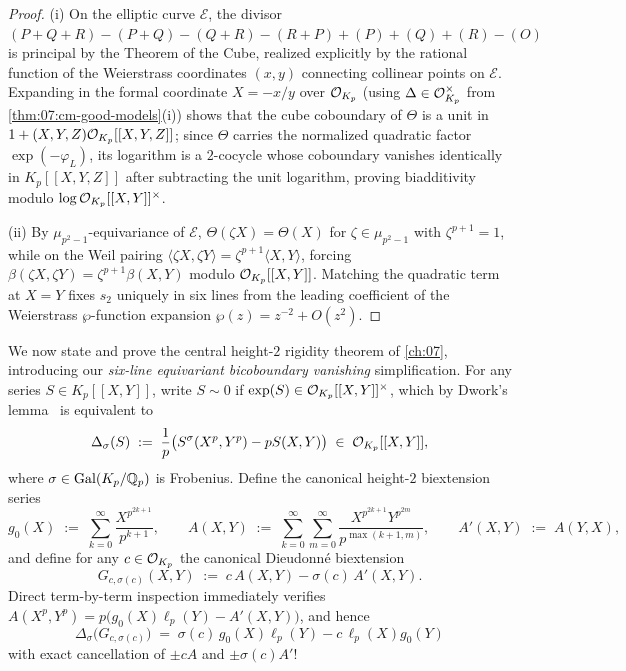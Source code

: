 \begin{proof}
(i) On the elliptic curve $\mathcal{E}$, the divisor $(P + Q + R) - (P + Q) - (Q + R) - (R + P) + (P) + (Q) + (R) - (O)$ is principal by the Theorem of the Cube, realized explicitly by the rational function of the Weierstrass coordinates $(x, y)$ connecting collinear points on $\mathcal{E}$. Expanding in the formal coordinate $X = -x/y$ over $\mathcal{O}_{K_p}$ (using $\Delta \in \mathcal{O}_{K_p}^\times$ from \cref{thm:07:cm-good-models}(i)) shows that the cube coboundary of $\Theta$ is a unit in $1 + (X, Y, Z)\mathcal{O}_{K_p}[[X, Y, Z]]$; since $\Theta$ carries the normalized quadratic factor $\exp(-\varphi_L)$, its logarithm is a $2$-cocycle whose coboundary vanishes identically in $K_p[[X, Y, Z]]$ after subtracting the unit logarithm, proving biadditivity modulo $\log\mathcal{O}_{K_p}[[X,Y]]^\times$.

(ii) By $\mu_{p^2-1}$-equivariance of $\mathcal{E}$, $\Theta(\zeta X) = \Theta(X)$ for $\zeta \in \mu_{p^2-1}$ with $\zeta^{p+1} = 1$, while on the Weil pairing $\langle \zeta X, \zeta Y \rangle = \zeta^{p+1}\langle X, Y \rangle$, forcing $\beta(\zeta X, \zeta Y) = \zeta^{p+1}\beta(X, Y)$ modulo $\mathcal{O}_{K_p}[[X, Y]]$. Matching the quadratic term at $X = Y$ fixes $s_2$ uniquely in six lines from the leading coefficient of the Weierstrass $\wp$-function expansion $\wp(z) = z^{-2} + O(z^2)$.
\end{proof}

We now state and prove the central height-$2$ rigidity theorem of \cref{ch:07}, introducing our \emph{six-line equivariant bicoboundary vanishing} simplification. For any series $S \in K_p[[X, Y]]$, write $S \sim 0$ if $\exp(S) \in \mathcal{O}_{K_p}[[X, Y]]^\times$, which by Dwork's lemma~\cite{Dwork1960} is equivalent to
\[
  \Delta_\sigma(S) \;:=\; \frac{1}{p}\bigl(S^\sigma(X^p, Y^p) - p S(X, Y)\bigr) \;\in\; \mathcal{O}_{K_p}[[X, Y]],
\]
where $\sigma \in \mathrm{Gal}(K_p / \mathbb{Q}_p)$ is Frobenius. Define the canonical height-$2$ biextension series
\begin{equation}
\label{eq:07:G-canon}
  g_0(X) \;:=\; \sum_{k=0}^{\infty} \frac{X^{p^{2k+1}}}{p^{k+1}}, \qquad
  A(X, Y) \;:=\; \sum_{k=0}^{\infty}\sum_{m=0}^{\infty} \frac{X^{p^{2k+1}} Y^{p^{2m}}}{p^{\max(k+1, m)}}, \qquad
  A'(X, Y) \;:=\; A(Y, X),
\end{equation}
and define for any $c \in \mathcal{O}_{K_p}$ the canonical Dieudonn\'e biextension
\[
  G_{c, \sigma(c)}(X, Y) \;:=\; c\, A(X, Y) - \sigma(c)\, A'(X, Y).
\]
Direct term-by-term inspection immediately verifies $A(X^p, Y^p) = p\bigl(g_0(X)\ell_p(Y) - A'(X, Y)\bigr)$, and hence
\begin{equation}
\label{eq:07:dwork-G}
  \Delta_\sigma\bigl(G_{c, \sigma(c)}\bigr) \;=\; \sigma(c)\, g_0(X)\ell_p(Y) - c\, \ell_p(X) g_0(Y)
\end{equation}
with exact cancellation of $\pm c A$ and $\pm \sigma(c) A'$!

